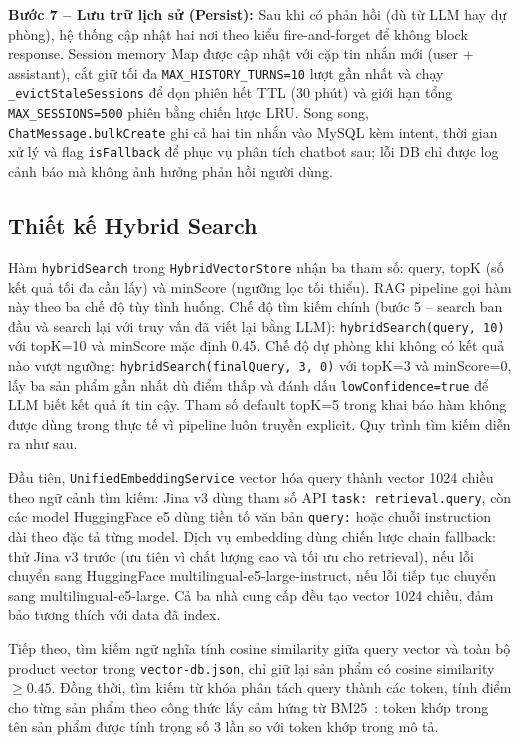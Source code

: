 \begin{sloppypar}
\textbf{Bước 7 -- Lưu trữ lịch sử (Persist):} Sau khi có phản hồi (dù từ LLM hay dự phòng), hệ thống cập nhật hai nơi theo kiểu fire-and-forget để không block response. Session memory Map được cập nhật với cặp tin nhắn mới (user + assistant), cắt giữ tối đa \texttt{MAX\_HISTORY\_TURNS=10} lượt gần nhất và chạy \texttt{\_evictStaleSessions} để dọn phiên hết TTL (30 phút) và giới hạn tổng \texttt{MAX\_SESSIONS=500} phiên bằng chiến lược LRU. Song song, \texttt{ChatMessage.bulkCreate} ghi cả hai tin nhắn vào MySQL kèm intent, thời gian xử lý và flag \texttt{isFallback} để phục vụ phân tích chatbot sau; lỗi DB chỉ được log cảnh báo mà không ảnh hưởng phản hồi người dùng.
\end{sloppypar}

\subsection{Thiết kế Hybrid Search}
\label{sec:c3_hybrid_search}

Hàm \texttt{hybridSearch} trong \texttt{HybridVectorStore} nhận ba tham số: query, topK (số kết quả tối đa cần lấy) và minScore (ngưỡng lọc tối thiểu). RAG pipeline gọi hàm này theo ba chế độ tùy tình huống. Chế độ tìm kiếm chính (bước 5 -- search ban đầu và search lại với truy vấn đã viết lại bằng LLM): \texttt{hybridSearch(query, 10)} với topK=10 và minScore mặc định 0.45. Chế độ dự phòng khi không có kết quả nào vượt ngưỡng: \texttt{hybridSearch(finalQuery, 3, 0)} với topK=3 và minScore=0, lấy ba sản phẩm gần nhất dù điểm thấp và đánh dấu \texttt{lowConfidence=true} để LLM biết kết quả ít tin cậy. Tham số default topK=5 trong khai báo hàm không được dùng trong thực tế vì pipeline luôn truyền explicit. Quy trình tìm kiếm diễn ra như sau.

Đầu tiên, \texttt{UnifiedEmbeddingService} vector hóa query thành vector 1024 chiều theo ngữ cảnh tìm kiếm: Jina v3 dùng tham số API \texttt{task: retrieval.query}, còn các model HuggingFace e5 dùng tiền tố văn bản \texttt{query:} hoặc chuỗi instruction dài theo đặc tả từng model. Dịch vụ embedding dùng chiến lược chain fallback: thử Jina v3 trước (ưu tiên vì chất lượng cao và tối ưu cho retrieval), nếu lỗi chuyển sang HuggingFace multilingual-e5-large-instruct, nếu lỗi tiếp tục chuyển sang multilingual-e5-large. Cả ba nhà cung cấp đều tạo vector 1024 chiều, đảm bảo tương thích với data đã index.

Tiếp theo, tìm kiếm ngữ nghĩa tính cosine similarity giữa query vector và toàn bộ product vector trong \texttt{vector-db.json}, chỉ giữ lại sản phẩm có cosine similarity $\geq 0.45$. Đồng thời, tìm kiếm từ khóa phân tách query thành các token, tính điểm cho từng sản phẩm theo công thức lấy cảm hứng từ BM25~\cite{robertson1994okapi}: token khớp trong tên sản phẩm được tính trọng số 3 lần so với token khớp trong mô tả.

